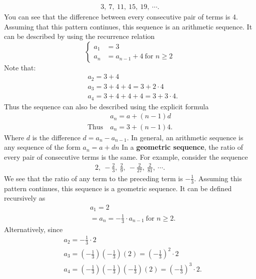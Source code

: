 \documentclass{report}
\begin{document}
    \begin{align*}
        3,\ 7,\ 11,\ 15,\ 19,\ \cdots
    .\end{align*}
    You can see that the difference between every consecutive pair of terms is  4. Assuming that this pattern continues, this sequence is an arithmetic sequence. It can be described by using the recurrence relation
       \begin{equation}
            \begin{cases}
                a_{1} &=  3\\
                a_{n} &= a_{n-1} + 4\ \text{for } n \geq 2
            \end{cases}
        \end{equation}
    \bigbreak \noindent 
    Note that:
    \begin{align*}
        &a_{2} = 3+4 \\
        &a_{3}=  3+4+4 = 3+2\cdot 4 \\
        &a_{4} =3+4+4+4 = 3+3 \cdot 4
    .\end{align*}
    Thus the sequence can also be described using the explicit formula
    \begin{align*}
        &a_{n} = a + (n-1)d \\
        \text{Thus}\ &a_{n} = 3 + (n-1)4
    .\end{align*}
    Where $d$ is the difference $d = a_{n} - a_{n-1}$.     In general, an arithmetic sequence is any sequence of the form  $a_{n} = a +dn$
    \bigbreak \noindent 
    In a \textbf{geometric sequence}, the ratio of every pair of consecutive terms is the same. For example, consider the sequence
    \begin{align*}
        2,\ -\frac{2}{3},\ \frac{2}{9},\ -\frac{2}{27},\ \frac{2}{81},\ \cdots 
    .\end{align*}
    \bigbreak \noindent 
    We see that the ratio of any term to the preceding term is  $-\frac{1}{3}$. Assuming this pattern continues, this sequence is a geometric sequence. It can be defined recursively as
    \begin{align*}
        &a_{1} = 2 \\
        &=a_{n} = -\frac{1}{3} \cdot a_{n-1}\ \text{for } n \geq 2
    .\end{align*}
    Alternatively, since
    \begin{align*}
        &a_{2} = -\frac{1}{3} \cdot 2 \\
        &a_{3} = \left(-\frac{1}{3}\right) \left(-\frac{1}{3}\right)(2) = \left(-\frac{1}{3}\right)^{2} \cdot 2 \\
        &a_{4} = \left(-\frac{1}{3}\right)\left(-\frac{1}{3}\right)\left(-\frac{1}{3}\right) (2) = \left(-\frac{1}{3}\right)^{3} \cdot 2
    .\end{align*}
\end{document}
